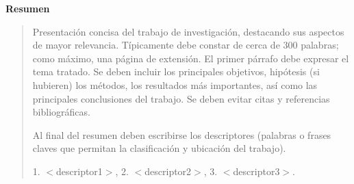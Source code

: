 \thispagestyle{empty}
\begin{center}
\begin{LARGE}
\textbf{Resumen}
\end{LARGE}
\end{center}
\begin{quotation}

Presentación concisa del trabajo de investigación, destacando sus aspectos de mayor relevancia. Típicamente debe constar de cerca de 300 palabras; como máximo, una página de extensión. El primer párrafo debe expresar el tema tratado. Se deben incluir los principales objetivos, hipótesis (si hubieren) los métodos, los resultados más importantes, así como las principales conclusiones del trabajo. Se deben evitar citas y referencias bibliográficas.

Al final del resumen deben escribirse los descriptores (palabras o frases claves que permitan la clasificación y ubicación del trabajo).
\vspace*{0.5cm}

 1. $<$descriptor1$>$, 2. $<$descriptor2$>$, 3. $<$descriptor3$>$.

\end{quotation}
